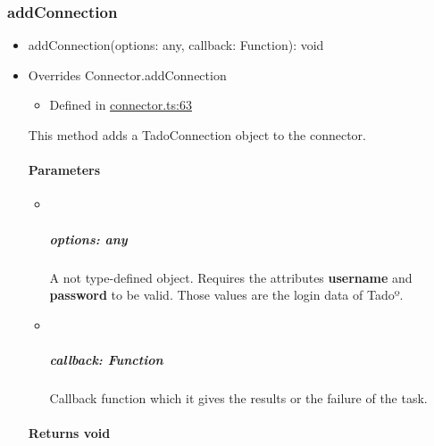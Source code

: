 \documentclass[]{article}
\providecommand{\tightlist}{%
  \setlength{\itemsep}{0pt}\setlength{\parskip}{0pt}}
\let\oldparagraph\paragraph
\renewcommand{\paragraph}[1]{\oldparagraph{#1}\mbox{}}
\let\oldsubparagraph\subparagraph
\renewcommand{\subparagraph}[1]{\oldsubparagraph{#1}\mbox{}}
\begin{document}
\protect\hypertarget{addconnection}{}{}

\hypertarget{addconnection}{%
\subsubsection{addConnection}\label{addconnection}}

\begin{itemize}
\tightlist
\item
  addConnection{(}options{: }{any}, callback{: }{Function}{)}{: }{void}
\end{itemize}

\begin{itemize}
\item
  Overrides Connector.addConnection

  \begin{itemize}
  \tightlist
  \item
    Defined in
    \href{https://github.com/BFMBFramework/TadoConnector/blob/f05932b/src/connector.ts\#L63}{connector.ts:63}
  \end{itemize}

  This method adds a TadoConnection object to the connector.

  \hypertarget{parameters}{%
  \paragraph{Parameters}\label{parameters}}

  \begin{itemize}
  \item ~
    \hypertarget{options-any}{%
    \subparagraph{\texorpdfstring{options:
    {any}}{options: any}}\label{options-any}}

    A not type-defined object. Requires the attributes \textbf{username}
    and \textbf{password} to be valid. Those values are the login data
    of Tadoº.
  \item ~
    \hypertarget{callback-function}{%
    \subparagraph{\texorpdfstring{callback:
    {Function}}{callback: Function}}\label{callback-function}}

    Callback function which it gives the results or the failure of the
    task.
  \end{itemize}

  \hypertarget{returns-void}{%
  \paragraph{\texorpdfstring{Returns
  {void}}{Returns void}}\label{returns-void}}
\end{itemize}
\end{document}
